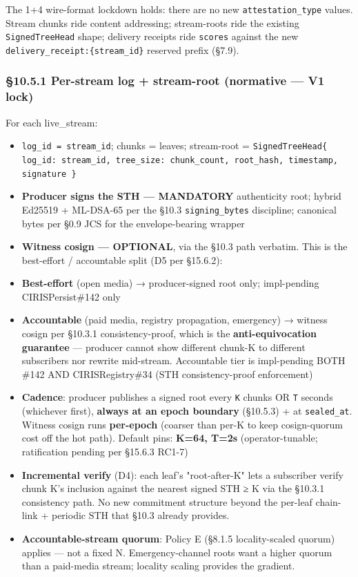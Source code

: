 \documentclass[11pt]{article}
\begin{document}
The 1+4 wire-format lockdown holds: there are no new \texttt{attestation\_type} values. Stream chunks ride content addressing; stream-roots ride the existing \texttt{SignedTreeHead} shape; delivery receipts ride \texttt{scores} against the new \texttt{delivery\_receipt:\{stream\_id\}} reserved prefix (§7.9).


\subsubsection*{§10.5.1 Per-stream log + stream-root (normative — V1 lock)}


For each live\_stream:


\begin{itemize}\setlength\itemsep{0pt}
\item \texttt{log\_id = stream\_id}; chunks = leaves; stream-root = \texttt{SignedTreeHead\{ log\_id: stream\_id, tree\_size: chunk\_count, root\_hash, timestamp, signature \}}
\item \textbf{Producer signs the STH — MANDATORY} authenticity root; hybrid Ed25519 + ML-DSA-65 per the §10.3 \texttt{signing\_bytes} discipline; canonical bytes per §0.9 JCS for the envelope-bearing wrapper
\item \textbf{Witness cosign — OPTIONAL}, via the §10.3 path verbatim. This is the best-effort / accountable split (D5 per §15.6.2):
\item \textbf{Best-effort} (open media) → producer-signed root only; impl-pending CIRISPersist\#142 only
\item \textbf{Accountable} (paid media, registry propagation, emergency) → witness cosign per §10.3.1 consistency-proof, which is the \textbf{anti-equivocation guarantee} — producer cannot show different chunk-K to different subscribers nor rewrite mid-stream. Accountable tier is impl-pending BOTH \#142 AND CIRISRegistry\#34 (STH consistency-proof enforcement)
\item \textbf{Cadence}: producer publishes a signed root every \texttt{K} chunks OR \texttt{T} seconds (whichever first), \textbf{always at an epoch boundary} (§10.5.3) + at \texttt{sealed\_at}. Witness cosign runs \textbf{per-epoch} (coarser than per-K to keep cosign-quorum cost off the hot path). Default pins: \textbf{K=64, T=2s} (operator-tunable; ratification pending per §15.6.3 RC1-7)
\item \textbf{Incremental verify} (D4): each leaf's "root-after-K" lets a subscriber verify chunk K's inclusion against the nearest signed STH ≥ K via the §10.3.1 consistency path. No new commitment structure beyond the per-leaf chain-link + periodic STH that §10.3 already provides.
\item \textbf{Accountable-stream quorum}: Policy E (§8.1.5 locality-scaled quorum) applies — not a fixed N. Emergency-channel roots want a higher quorum than a paid-media stream; locality scaling provides the gradient.
\end{itemize}
\end{document}
